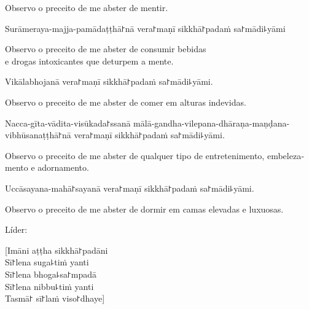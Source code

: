 \begin{english}
  Observo o preceito de me abster de mentir.
\end{english}

\clearpage

\begin{precept}
  \setcounter{enumi}{4}
  \item Surāmeraya-majja-pamādaṭṭhā꜓nā vera꜓maṇī sikkhā꜓padaṁ sa꜓mādi꜕yāmi
\end{precept}

\begin{english}
  Observo o preceito de me abster de consumir bebidas\\
  e drogas intoxicantes que deturpem a mente.
\end{english}

\begin{precept}
  \setcounter{enumi}{5}
  \item Vikālabhojanā vera꜓maṇī sikkhā꜓padaṁ sa꜓mādi꜕yāmi.
\end{precept}

\begin{english}
  Observo o preceito de me abster de comer em alturas indevidas.
\end{english}

\begin{precept}
  \setcounter{enumi}{6}
  \item Nacca-gīta-vādita-visūkada꜓ssanā mālā-gandha-vilepana-dhāraṇa-maṇḍana-vibhūsanaṭṭhā꜓nā vera꜓maṇī sikkhā꜓padaṁ sa꜓mādi꜕yāmi.
\end{precept}

\begin{english}
  Observo o preceito de me abster de qualquer tipo de entretenimento, embelezamento e adornamento.
\end{english}

\begin{precept}
  \setcounter{enumi}{7}
  \item Uccāsayana-mahā꜓sayanā vera꜓maṇī sikkhā꜓padaṁ sa꜓mādi꜕yāmi.
\end{precept}

\begin{english}
  Observo o preceito de me abster de dormir em camas elevadas e luxuosas.
\end{english}

\begin{instruction}
  Líder:
\end{instruction}

[Imāni aṭṭha sikkhā꜓padāni\\
Sī꜓lena suga꜕tiṁ yanti\\
Sī꜓lena bhoga꜕sa꜓mpadā\\
Sī꜓lena nibbu꜕tiṁ yanti\\
Tasmā꜓ sī꜓laṁ viso꜓dhaye]

